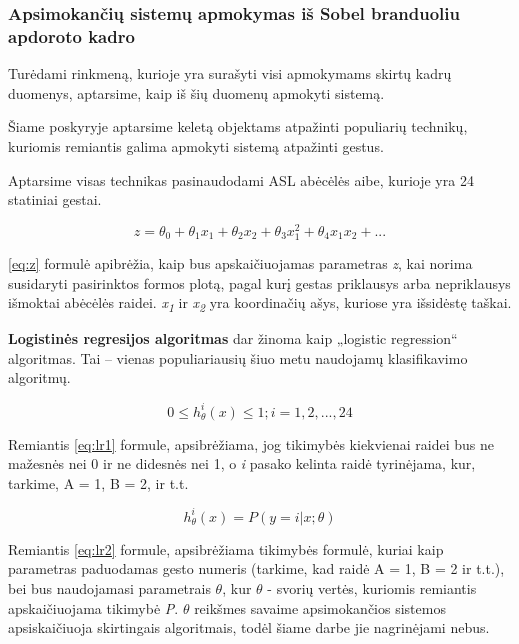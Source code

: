 \documentclass{VUMIFInfKursinis}
\begin{document}
\subsubsection{Apsimokančių sistemų apmokymas iš Sobel branduoliu apdoroto kadro}
Turėdami rinkmeną, kurioje yra surašyti visi apmokymams skirtų kadrų duomenys, aptarsime, kaip iš šių duomenų apmokyti sistemą.

Šiame poskyryje aptarsime keletą objektams atpažinti populiarių technikų, kuriomis remiantis galima apmokyti sistemą atpažinti gestus.

Aptarsime visas technikas pasinaudodami ASL abėcėlės aibe, kurioje yra 24 statiniai gestai.

\begin{equation}\label{eq:z}
	z = \theta_0+\theta_1x_1+\theta_2x_2+\theta_3x_1^2+\theta_4x_1x_2+...
\end{equation}

\ref{eq:z} formulė apibrėžia, kaip bus apskaičiuojamas parametras \textit{z}, kai norima susidaryti pasirinktos formos plotą, pagal kurį gestas priklausys arba nepriklausys išmoktai abėcėlės raidei. \textit{x\textsubscript{1}} ir \textit{x\textsubscript{2}} yra koordinačių ašys, kuriose yra išsidėstę taškai.


\textbf{Logistinės regresijos algoritmas} dar žinoma kaip „logistic regression“ algoritmas. Tai – vienas populiariausių šiuo metu naudojamų klasifikavimo algoritmų.

\begin{equation}\label{eq:lr1}
	0 \leq h_\theta^i(x) \leq 1; i = 1, 2, ..., 24
\end{equation}

Remiantis \ref{eq:lr1} formule, apsibrėžiama, jog tikimybės kiekvienai raidei bus ne mažesnės nei 0 ir ne didesnės nei 1, o \textit{i} pasako kelinta raidė tyrinėjama, kur, tarkime, A = 1, B = 2, ir t.t.


\begin{equation}\label{eq:lr2}
	h_\theta^i(x) = P(y=i | x; \theta)
\end{equation}

Remiantis \ref{eq:lr2} formule, apsibrėžiama tikimybės formulė, kuriai kaip parametras paduodamas gesto numeris (tarkime, kad raidė A = 1, B = 2 ir t.t.), bei bus naudojamasi parametrais $\theta$, kur  $\theta$ - svorių vertės, kuriomis remiantis apskaičiuojama tikimybė 
\textit{P}. $\theta$ reikšmes savaime apsimokančios sistemos apsiskaičiuoja skirtingais algoritmais, todėl šiame darbe jie nagrinėjami nebus.
\end{document}
